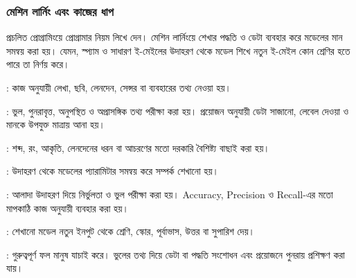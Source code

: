 \begin{topicbody}
\subsubsection{মেশিন লার্নিং এবং কাজের ধাপ}
প্রচলিত প্রোগ্রামিংয়ে প্রোগ্রামার নিয়ম লিখে দেন। মেশিন লার্নিংয়ে শেখার পদ্ধতি ও ডেটা ব্যবহার করে মডেলের মান সমন্বয় করা হয়। যেমন, স্প্যাম ও সাধারণ ই-মেইলের উদাহরণ থেকে মডেল শিখে নতুন ই-মেইল কোন শ্রেণির হতে পারে তা নির্ণয় করে।
\begin{compactenum}
\item {}: কাজ অনুযায়ী লেখা, ছবি, লেনদেন, সেন্সর বা ব্যবহারের তথ্য নেওয়া হয়।
\item {}: ভুল, পুনরাবৃত্ত, অনুপস্থিত ও অপ্রাসঙ্গিক তথ্য পরীক্ষা করা হয়। প্রয়োজন অনুযায়ী ডেটা সাজানো, লেবেল দেওয়া ও মানকে উপযুক্ত মাত্রায় আনা হয়।
\item {}: শব্দ, রং, আকৃতি, লেনদেনের ধরন বা আচরণের মতো দরকারি বৈশিষ্ট্য বাছাই করা হয়।
\item {}: উদাহরণ থেকে মডেলের প্যারামিটার সমন্বয় করে সম্পর্ক শেখানো হয়।
\item {}: আলাদা উদাহরণ দিয়ে নির্ভুলতা ও ভুল পরীক্ষা করা হয়। Accuracy, Precision ও Recall-এর মতো মাপকাঠি কাজ অনুযায়ী ব্যবহার করা হয়।
\item {}: শেখানো মডেল নতুন ইনপুট থেকে শ্রেণি, স্কোর, পূর্বাভাস, উত্তর বা সুপারিশ দেয়।
\item {}: গুরুত্বপূর্ণ ফল মানুষ যাচাই করে। ভুলের তথ্য দিয়ে ডেটা বা পদ্ধতি সংশোধন এবং প্রয়োজনে পুনরায় প্রশিক্ষণ করা যায়।
\end{compactenum}
\label{fig:ch1-pair-31}


\end{topicbody}
